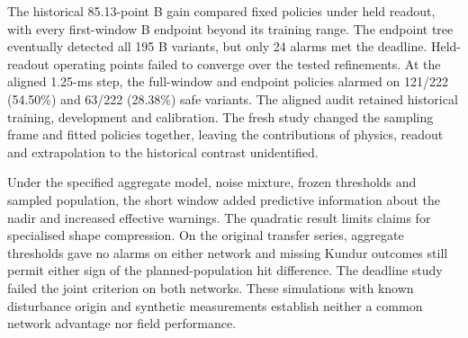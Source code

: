 \documentclass[10pt]{article}
\begin{document}
The historical 85.13-point B gain compared fixed policies under held readout, with every first-window B endpoint beyond its training range. The endpoint tree eventually detected all 195 B variants, but only 24 alarms met the deadline. Held-readout operating points failed to converge over the tested refinements. At the aligned 1.25-ms step, the full-window and endpoint policies alarmed on 121/222 (54.50\%) and 63/222 (28.38\%) safe variants. The aligned audit retained historical training, development and calibration. The fresh study changed the sampling frame and fitted policies together, leaving the contributions of physics, readout and extrapolation to the historical contrast unidentified.

Under the specified aggregate model, noise mixture, frozen thresholds and sampled population, the short window added predictive information about the nadir and increased effective warnings. The quadratic result limits claims for specialised shape compression. On the original transfer series, aggregate thresholds gave no alarms on either network and missing Kundur outcomes still permit either sign of the planned-population hit difference. The deadline study failed the joint criterion on both networks. These simulations with known disturbance origin and synthetic measurements establish neither a common network advantage nor field performance.
\end{document}
